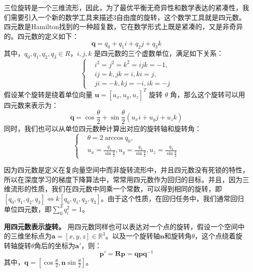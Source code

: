三位旋转是一个三维流形，因此，为了最优平衡无奇异性和数学表达的紧凑性，我们需要引入一个新的数学工具来描述3自由度的旋转，这个数学工具就是四元数。四元数是Hamilton找到的一种超复数，它在数学形式上既是紧凑的，又是非奇异的。四元数的定义如下：
\begin{equation}
    \boldsymbol{q} = q_0 + q_1 i + q_2 j + q_3 k
\end{equation}
其中，$q_0, q_1, q_2, q_3 \in R$，$i, j, k$ 是四元数的三个虚数单位，满足如下关系：
\begin{equation}
    \left\{
    \begin{aligned}
        &i^2 = j^2 = k^2 = ijk = -1, \\
        &ij = k, jk = i, ki = j, \\
        &ji = -k, kj = -i, ik = -j
    \end{aligned}
    \right.
\end{equation}
假设某个旋转是绕着单位向量 $\boldsymbol{u} = [u_x, u_y, u_z]^T$ 旋转 $\theta$ 角，那么这个旋转可以用四元数来表示为：
\begin{equation}
    \boldsymbol{q} = \cos \frac{\theta}{2} + \sin \frac{\theta}{2} (u_x i + u_y j + u_z k)
\end{equation}
同时，我们也可以从单位四元数种计算出对应的旋转轴和旋转角：
\begin{equation}
    \left\{
    \begin{aligned}
        &\theta = 2 \arccos q_0, \\
        &u_x = \frac{q_1}{\sin \frac{\theta}{2}}, u_y = \frac{q_2}{\sin \frac{\theta}{2}}, u_z = \frac{q_3}{\sin \frac{\theta}{2}}
    \end{aligned}
    \right.
\end{equation}

因为四元数是定义在复向量空间中而非旋转流形中，并且四元数没有死锁的特性，所以在深度学习的梯度下降算法中，常常用四元数作为回归的目标。并且，因为三维流形的性质，我们在四元数中同乘一个常数，可以得到相同的旋转，即$[q_0, q_1, q_2, q_3] \iff k[q_0, q_1, q_2, q_3]$。由于这个性质，在回归任务中，我们通常回归单位四元数，即$\sum_0^3 q_i^2 = 1$。

{\bf 用四元数表示旋转。} 用四元数同样也可以表达对一个点的旋转，假设一个空间中的三维坐标点为$\boldsymbol{a} = [x, y, z] \in \mathbb{R}^3$。以及一个旋转轴$\boldsymbol{n}$和旋转角$\theta$，这个点绕着旋转轴旋转$\theta$角后的坐标为$\boldsymbol{a}'$，则：
\begin{equation}
    \boldsymbol{p}' = \boldsymbol{Rp} = \boldsymbol{qpq}^{-1}
\end{equation}
其中，$\boldsymbol{q} = [\cos \frac{\theta}{2}, \boldsymbol{n} \sin \frac{\theta}{2}]$。


